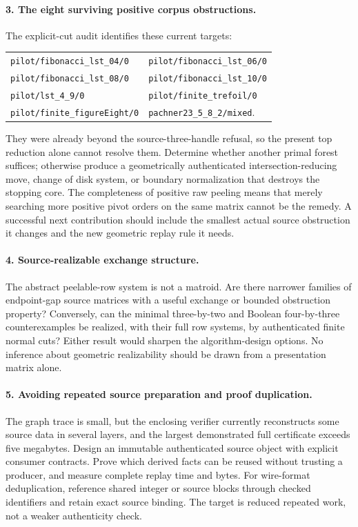 \paragraph{3. The eight surviving positive corpus obstructions.}
The explicit-cut audit identifies these current targets:
\begin{center}\small
\begin{tabular}{ll}
\texttt{pilot/fibonacci\_lst\_04/0} & \texttt{pilot/fibonacci\_lst\_06/0}\\
\texttt{pilot/fibonacci\_lst\_08/0} & \texttt{pilot/fibonacci\_lst\_10/0}\\
\texttt{pilot/lst\_4\_9/0} & \texttt{pilot/finite\_trefoil/0}\\
\texttt{pilot/finite\_figureEight/0} & \texttt{pachner23\_5\_8\_2/mixed}.
\end{tabular}
\end{center}
They were already beyond the source-three-handle refusal, so the present top
reduction alone cannot resolve them. Determine whether another primal
forest suffices; otherwise produce a geometrically authenticated
intersection-reducing move, change of disk system, or boundary normalization
that destroys the stopping core. The completeness of positive raw peeling
means that merely searching more positive pivot orders on the same matrix
cannot be the remedy. A successful next contribution should include the
smallest actual source obstruction it changes and the new geometric replay
rule it needs.

\paragraph{4. Source-realizable exchange structure.}
The abstract peelable-row system is not a matroid. Are there narrower
families of endpoint-gap source matrices with a useful exchange or bounded
obstruction property? Conversely, can the minimal three-by-two and Boolean
four-by-three counterexamples be realized, with their full row systems,
by authenticated finite normal cuts? Either result would sharpen the
algorithm-design options. No inference about geometric realizability
should be drawn from a presentation matrix alone.

\paragraph{5. Avoiding repeated source preparation and proof duplication.}
The graph trace is small, but the enclosing verifier currently reconstructs
some source data in several layers, and the largest demonstrated full
certificate exceeds five megabytes. Design an immutable authenticated
source object with explicit consumer contracts. Prove which derived facts
can be reused without trusting a producer, and measure complete replay
time and bytes. For wire-format deduplication, reference shared integer or
source blocks through checked identifiers and retain exact source binding.
The target is reduced repeated work, not a weaker authenticity check.

